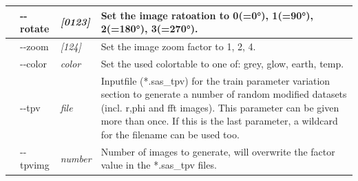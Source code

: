 \documentclass[11pt]{article} %
\begin{document}
\begin{longtable}{|L{1cm}|L{2cm}|C{2cm}|L{12cm}|}
 & -{}-rotate & {\it [0123]} & Set the image ratoation to 0(=0°), 1(=90°), 2(=180°), 3(=270°). \\ \hline
 & -{}-zoom & {\it [124]} & Set the image zoom factor to 1, 2, 4. \\ \hline
 & -{}-color & {\it color} & Set the used colortable to one of: grey, glow, earth, temp. \\ \hline
 & -{}-tpv & {\it file} & Inputfile (*.sas\_tpv) for the train parameter variation section to generate a number of random modified datasets (incl. r,phi and fft images). This parameter can be given more than once. If this is the last parameter, a wildcard for the filename can be used too. \\ \hline
 & -{}-tpvimg & {\it number} & Number of images to generate, will overwrite the factor value in the *.sas\_tpv files. \\ \hline
\end{longtable}
\end{document}
